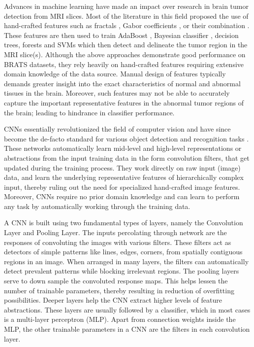 \documentclass[journal,twocolumn]{IEEEtran}
\begin{document}
Advances in machine learning have made an impact over research in brain tumor detection from  MRI slices. Most of the literature in this field proposed the use of hand-crafted features such as fractals \cite{Islam2013multifractal}, Gabor coefficients \cite{Subbanna2013, Wu2014_des}, or their combination  \cite{Soltaninejad2016}. These features are then used to train  AdaBoost \cite{Islam2013multifractal}, Bayesian classifier \cite{Subbanna2013}, decision trees, forests and SVMs \cite{Soltaninejad2016,Zikic2012decision} which then detect and delineate the tumor region in the MRI slice(s). Although the above approaches demonstrate good performance on BRATS datasets, they  rely heavily on hand-crafted features  requiring extensive domain knowledge of the data source. Manual design of  features typically demands greater insight into the exact characteristics of normal and abnormal tissues in the brain. Moreover, such features may not  be  able to accurately capture the important representative features in the abnormal tumor regions of the brain; leading to hindrance in classifier performance.

CNNs essentially revolutionized the field of computer vision and have since become the de-facto standard for various object detection and recognition tasks \cite{Farabet2013, Goodfellow2013_captcha, Zhang2014_overfeat, Simonyan2014_verydeepcnn}. These networks automatically learn mid-level and high-level representations or abstractions from the input training data in the form convolution filters, that get updated during the training process. They work directly on raw input (image) data, and learn the underlying representative features of hierarchically complex  input, thereby ruling out the need for specialized hand-crafted image features. Moreover, CNNs  require no prior domain knowledge and can learn to perform any task  by automatically working through the training data.

A CNN  is built using two fundamental types of layers, namely the Convolution Layer and Pooling Layer.
The inputs percolating through network are the responses of convoluting the images with various filters. These filters act as detectors of simple patterns like lines, edges, corners, from spatially  contiguous regions in an image. When arranged in many layers, the filters can automatically detect prevalent patterns while blocking irrelevant regions. The pooling layers serve to down sample the convoluted response maps. This helps lessen  the number of  trainable parameters, thereby resulting in reduction of overfitting possibilities. Deeper layers help the CNN extract higher levels of feature abstractions.
These layers are usually followed by a classifier, which in most cases is a multi-layer perceptron (MLP). Apart from connection weights inside the MLP, the other trainable parameters in a CNN  are the filters in each convolution layer.
\end{document}
